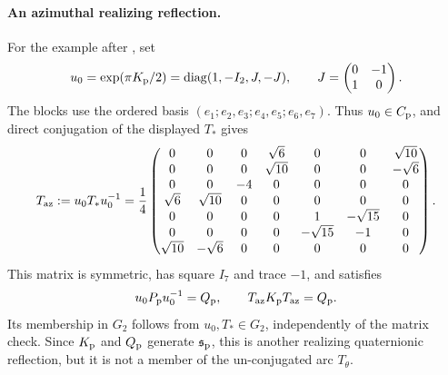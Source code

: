 \documentclass[11pt,a4paper]{article}
\begin{document}
\paragraph{An azimuthal realizing reflection.}
For the example after , set
\[
u_0=\exp(\pi K_{\rm p}/2)=\operatorname{diag}(1,-I_2,J,-J),
\qquad J=\begin{pmatrix}0&-1\\1&0\end{pmatrix}.
\]
The blocks use the ordered basis $(e_1; e_2,e_3; e_4,e_5; e_6,e_7)$.
Thus $u_0\in C_{\rm p}$, and direct conjugation of the displayed $T_*$ gives
\[
T_{\rm az}:=u_0T_*u_0^{-1}
=\frac14\begin{pmatrix}
0&0&0&\sqrt6&0&0&\sqrt{10}\\
0&0&0&\sqrt{10}&0&0&-\sqrt6\\
0&0&-4&0&0&0&0\\
\sqrt6&\sqrt{10}&0&0&0&0&0\\
0&0&0&0&1&-\sqrt{15}&0\\
0&0&0&0&-\sqrt{15}&-1&0\\
\sqrt{10}&-\sqrt6&0&0&0&0&0
\end{pmatrix}.
\]
This matrix is symmetric, has square $I_7$ and trace $-1$, and satisfies
\[
u_0P_{\rm p}u_0^{-1}=Q_{\rm p},\qquad
T_{\rm az}K_{\rm p}T_{\rm az}=Q_{\rm p}.
\]
Its membership in $G_2$ follows from $u_0,T_*\in G_2$, independently of the matrix check.
Since $K_{\rm p}$ and $Q_{\rm p}$ generate $\mathfrak s_{\rm p}$, this is another realizing quaternionic reflection, but it is not a member of the un-conjugated arc $T_\theta$.
\end{document}
